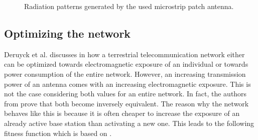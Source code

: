 \documentclass[twocolumn]{phdsymp} %
\begin{document}
\vspace{ 6.3mm }

\begin{figure}[!htb]
\hfill
{}
  \caption{Radiation patterns generated by the used microstrip patch antenna.}
\label{fig:radpattern}
\end{figure}

\subsection{Optimizing the network}
Deruyck et al. discusses in \cite{J1} how a terrestrial  telecommunication network either can be optimized towards electromagnetic 
exposure of an individual or towards power consumption of the entire network. 
However, an increasing transmission power of an antenna comes with an increasing electromagnetic exposure. This is not the case considering
both values for an entire network. In fact, the authors from \cite{J1}  prove that both become inversely equivalent.
The reason why the network behaves like this is because it is often cheaper to increase the exposure of an already active base station 
than activating a new one. 
This leads to the following fitness function which is based on \cite{J1}.
\end{document}
